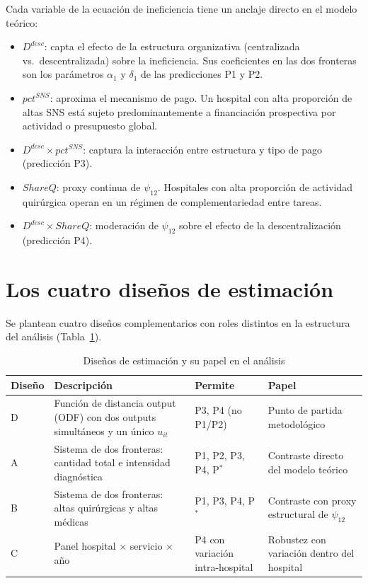 \documentclass[12pt, a4paper, twoside, openright]{book}
\theoremstyle{plain}
\theoremstyle{definition}
\theoremstyle{remark}
\begin{document}
Cada variable de la ecuación de ineficiencia tiene un anclaje directo en el modelo teórico:
\begin{itemize}
  \item $D^{desc}$: capta el efecto de la estructura organizativa (centralizada vs.\ descentralizada) sobre la ineficiencia. Sus coeficientes en las dos fronteras son los parámetros $\alpha_1$ y $\delta_1$ de las predicciones P1 y P2.
  \item $pct^{SNS}$: aproxima el mecanismo de pago. Un hospital con alta proporción de altas SNS está sujeto predominantemente a financiación prospectiva por actividad o presupuesto global.
  \item $D^{desc}\times pct^{SNS}$: captura la interacción entre estructura y tipo de pago (predicción P3).
  \item $ShareQ$: proxy continua de $\psi_{12}$. Hospitales con alta proporción de actividad quirúrgica operan en un régimen de complementariedad entre tareas.
  \item $D^{desc}\times ShareQ$: moderación de $\psi_{12}$ sobre el efecto de la descentralización (predicción P4).
\end{itemize}

\section{Los cuatro diseños de estimación}

Se plantean cuatro diseños complementarios con roles distintos en la estructura del análisis (Tabla~\ref{tab:disenos}).

\begin{table}[htbp]
\centering
\caption{Diseños de estimación y su papel en el análisis}
\label{tab:disenos}
\begin{threeparttable}
\small
\begin{tabular}{p{1.2cm}p{3.5cm}p{2.5cm}p{3.5cm}}
\toprule
\textbf{Diseño} & \textbf{Descripción} &
\textbf{Permite} & \textbf{Papel} \\
\midrule
D & Función de distancia output (ODF) con dos outputs simultáneos y un único $u_{it}$
  & P3, P4 (no P1/P2)
  & Punto de partida metodológico \\[6pt]
A & Sistema de dos fronteras: cantidad total e intensidad diagnóstica
  & P1, P2, P3, P4, P$^*$
  & Contraste directo del modelo teórico \\[6pt]
B & Sistema de dos fronteras: altas quirúrgicas y altas médicas
  & P1, P3, P4, P$^*$
  & Contraste con proxy estructural de $\psi_{12}$ \\[6pt]
C & Panel hospital $\times$ servicio $\times$ año
  & P4 con variación intra-hospital
  & Robustez con variación dentro del hospital \\
\bottomrule
\end{tabular}
\end{threeparttable}
\end{table}
\end{document}

